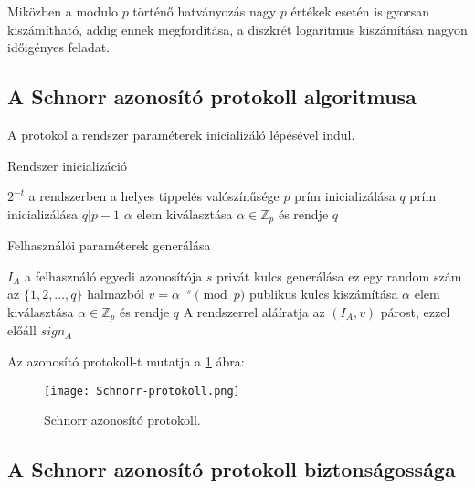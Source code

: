 Miközben a modulo $p$ történő hatványozás nagy $p$ értékek esetén is gyorsan kiszámítható, addig ennek megfordítása, a diszkrét logaritmus kiszámítása nagyon időigényes feladat.

\subsection{A Schnorr azonosító protokoll algoritmusa}

A protokol a rendszer paraméterek inicializáló lépésével indul.

\begin{algorithm}[H]
    \caption{Rendszer inicializáció}
    \label{algorithm:systemInit}
    \begin{algorithmic}
         \Comment $2^{-t}$ a rendszerben a helyes tippelés valószínűsége
        \State $p$ prím inicializálása
        \State $q$ prím inicializálása \Comment $q | p-1$
        \State $\alpha$ elem kiválasztása \Comment $\alpha \in \mathbb{Z}_{p}$ és rendje $q$
        \EndProcedure
    \end{algorithmic}
\end{algorithm}

\begin{algorithm}[H]
    \caption{Felhasználói paraméterek generálása}
    \label{algorithm:userInit}
    \begin{algorithmic}
         \Comment $I_{A}$ a felhasználó egyedi azonosítója
        \State $s$ privát kulcs generálása \Comment ez egy random szám az $\{1,2,...,q\}$ halmazból
        \State $v = \alpha^{-s} \pmod{p}$ publikus kulcs kiszámítása
        \State $\alpha$ elem kiválasztása \Comment $\alpha \in \mathbb{Z}_{p}$ és rendje $q$
        \State A rendszerrel aláíratja az $(I_{A}, v)$ párost, ezzel előáll $sign_{A}$
        \EndProcedure
    \end{algorithmic}
\end{algorithm}

Az azonosító protokoll-t mutatja a \ref{Figure::SchnorrProt} ábra:

\begin{figure}[H]
    \centering
    \texttt{[image: Schnorr-protokoll.png]}
    \caption{Schnorr azonosító protokoll.}
    \label{Figure::SchnorrProt}
\end{figure}

\subsection{A Schnorr azonosító protokoll biztonságossága}

